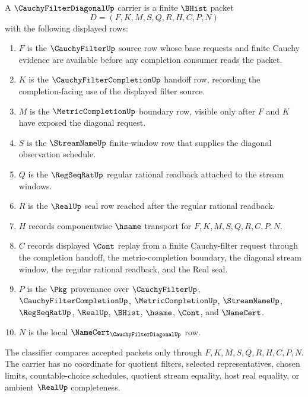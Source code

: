 \begin{definition}
\label{def:cauchy-filter-diagonal-carrier}
A $\CauchyFilterDiagonalUp$ carrier is a finite $\BHist$ packet
$$
D=(F,K,M,S,Q,R,H,C,P,N)
$$
with the following displayed rows:
\begin{enumerate}
\item $F$ is the $\CauchyFilterUp$ source row whose base requests and finite Cauchy evidence are available before any completion consumer reads the packet.
\item $K$ is the $\CauchyFilterCompletionUp$ handoff row, recording the completion-facing use of the displayed filter source.
\item $M$ is the $\MetricCompletionUp$ boundary row, visible only after $F$ and $K$ have exposed the diagonal request.
\item $S$ is the $\StreamNameUp$ finite-window row that supplies the diagonal observation schedule.
\item $Q$ is the $\RegSeqRatUp$ regular rational readback attached to the stream windows.
\item $R$ is the $\RealUp$ seal row reached after the regular rational readback.
\item $H$ records componentwise $\hsame$ transport for $F,K,M,S,Q,R,C,P,N$.
\item $C$ records displayed $\Cont$ replay from a finite Cauchy-filter request through the completion handoff, the metric-completion boundary, the diagonal stream window, the regular rational readback, and the Real seal.
\item $P$ is the $\Pkg$ provenance over $\CauchyFilterUp$, $\CauchyFilterCompletionUp$, $\MetricCompletionUp$, $\StreamNameUp$, $\RegSeqRatUp$, $\RealUp$, $\BHist$, $\hsame$, $\Cont$, and $\NameCert$.
\item $N$ is the local $\NameCert_{\CauchyFilterDiagonalUp}$ row.
\end{enumerate}
The classifier compares accepted packets only through $F,K,M,S,Q,R,H,C,P,N$. The carrier has no coordinate for quotient filters, selected representatives, chosen limits, countable-choice schedules, quotient stream equality, host real equality, or ambient $\RealUp$ completeness.
\end{definition}


